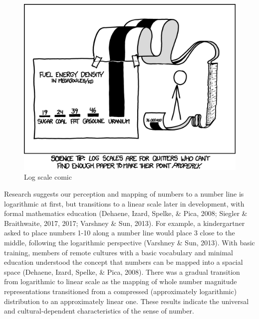 \documentclass[print]{nuthesis}
\begin{document}
\begin{figure}[tbp]

{\centering \includegraphics[width=0.7\linewidth,]{images/log-scale-comic} 

}

\caption{Log scale comic}\label{fig:log-scale-comic}
\end{figure}


Research suggests our perception and mapping of numbers to a number line is logarithmic at first, but transitions
to a linear scale later in development, with formal mathematics education (Dehaene, Izard, Spelke, \& Pica, 2008; Siegler \& Braithwaite, 2017, 2017; Varshney \& Sun, 2013).
For example, a kindergartner asked to place numbers 1-10 along a number line would place 3 close to the middle, following the logarithmic perspective (Varshney \& Sun, 2013). 
With basic training, members of remote cultures with a basic vocabulary and minimal education understood the concept that numbers can be mapped into a spacial space (Dehaene, Izard, Spelke, \& Pica, 2008). 
There was a gradual transition from logarithmic to linear scale as the mapping of whole number magnitude representations transitioned from a compressed (approximately logarithmic) distribution to an approximately linear one.
These results indicate the universal and cultural-dependent characteristics of the sense of number.

\end{document}
